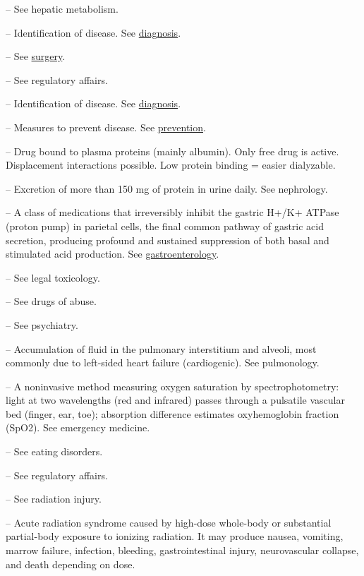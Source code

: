 -- See hepatic metabolism.

-- Identification of disease. See \hyperlink{Diagnosis}{diagnosis}.

-- See \hyperlink{Surgery}{surgery}.

-- See regulatory affairs.

-- Identification of disease. See \hyperlink{Diagnosis}{diagnosis}.

-- Measures to prevent disease. See \hyperlink{Prevention}{prevention}.

-- Drug bound to plasma proteins (mainly albumin). Only free drug is active. Displacement interactions possible. Low protein binding = easier dialyzable.

-- Excretion of more than 150 mg of protein in urine daily. See nephrology.

-- A class of medications that irreversibly inhibit the gastric H+/K+ ATPase (proton pump) in parietal cells, the final common pathway of gastric acid secretion, producing profound and sustained suppression of both basal and stimulated acid production. See \hyperlink{Gastroenterology}{gastroenterology}.

-- See legal toxicology.

-- See drugs of abuse.

-- See psychiatry.

-- Accumulation of fluid in the pulmonary interstitium and alveoli, most commonly due to left-sided heart failure (cardiogenic). See pulmonology.

-- A noninvasive method measuring oxygen saturation by spectrophotometry: light at two wavelengths (red and infrared) passes through a pulsatile vascular bed (finger, ear, toe); absorption difference estimates oxyhemoglobin fraction (SpO2). See emergency medicine.

-- See eating disorders.

-- See regulatory affairs.

-- See radiation injury.

-- Acute radiation syndrome caused by high-dose whole-body or substantial partial-body exposure to ionizing radiation. It may produce nausea, vomiting, marrow failure, infection, bleeding, gastrointestinal injury, neurovascular collapse, and death depending on dose.

